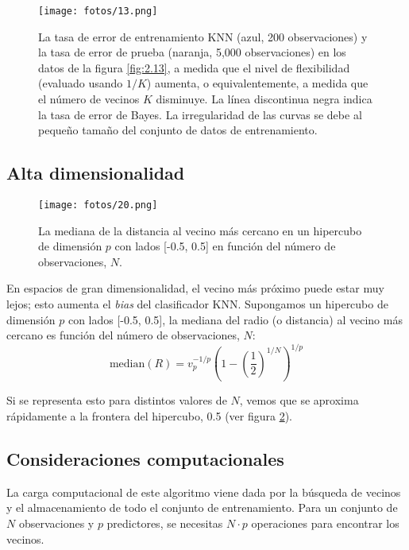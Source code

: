\begin{figure}[H]
\centering
\texttt{[image: fotos/13.png]}
\caption{La tasa de error de entrenamiento KNN (azul, 200 observaciones) y la tasa de error de prueba (naranja, 5,000 observaciones) en los datos de la figura \ref{fig:2.13}, a medida que el nivel de flexibilidad (evaluado usando $1/K$) aumenta, o equivalentemente, a medida que el número de vecinos $K$ disminuye. La línea discontinua negra indica la tasa de error de Bayes. La irregularidad de las curvas se debe al pequeño tamaño del conjunto de datos de entrenamiento.}
\label{fig:2.17}
\end{figure}

\subsection{Alta dimensionalidad}

\begin{figure}[h]
\centering
\texttt{[image: fotos/20.png]}
\caption{La mediana de la distancia al vecino más cercano en un hipercubo de dimensión $p$ con lados [-0.5, 0.5] en función del número de observaciones, $N$.}
\label{fig:5.18}
\end{figure}

En espacios de gran dimensionalidad, el vecino más próximo puede estar muy lejos; esto aumenta el \textit{bias} del clasificador KNN. Supongamos un hipercubo de dimensión $p$ con lados [-0.5, 0.5], la mediana del radio (o distancia) al vecino más cercano es función del número de observaciones, $N$:
\begin{equation}
\text{median}(R) = v_p^{-1/p} \left(1 - \left(\frac{1}{2}\right)^{1/N}\right)^{1/p}
\end{equation}

Si se representa esto para distintos valores de $N$, vemos que se aproxima rápidamente a la frontera del hipercubo, 0.5 (ver figura \ref{fig:5.18}). 

\subsection{Consideraciones computacionales}

La carga computacional de este algoritmo viene dada por la búsqueda de vecinos y el almacenamiento de todo el conjunto de entrenamiento. Para un conjunto de $N$ observaciones y $p$ predictores, se necesitas $N \cdot p$ operaciones para encontrar los vecinos. \\

